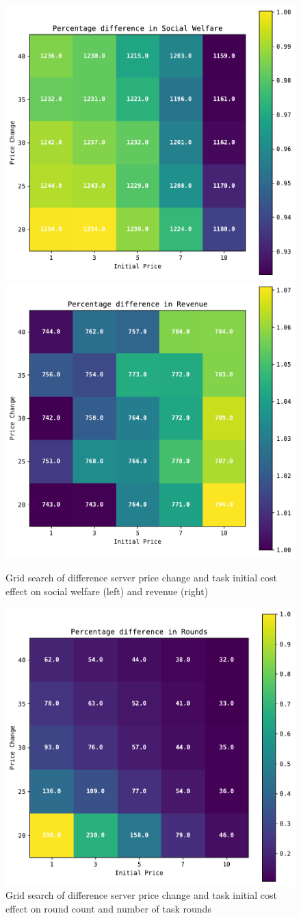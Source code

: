 \begin{figure}[h]
    \centering
    \includegraphics[width=0.45\linewidth]{figs/dia_heuristics/social_welfare_grid.pdf}
    \includegraphics[width=0.45\linewidth]{figs/dia_heuristics/revenue_grid.pdf}
    \caption{Grid search of difference server price change and task initial cost effect on social welfare (left) and
             revenue (right)}
    \label{fig:dia_sw_rev_grid_search}
\end{figure}

\begin{figure}[h]
    \centering
    \includegraphics[width=0.45\linewidth]{figs/dia_heuristics/rounds_grid.pdf}
    \caption{Grid search of difference server price change and task initial cost effect on round count and number of
             task rounds}
    \label{fig:dia_rounds_grid_search}
\end{figure}

